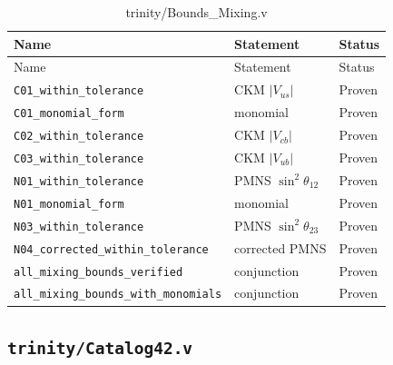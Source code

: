 \begin{longtable}{lll}
\toprule
Name & Statement & Status \\
\midrule
\endfirsthead
\toprule
Name & Statement & Status \\
\midrule
\endhead
\bottomrule
\endfoot
\bottomrule
\caption{trinity/Bounds\_Mixing.v}
\endlastfoot
\texttt{C01\_within\_tolerance} & CKM $|V_{us}|$ & Proven \\
\texttt{C01\_monomial\_form} & monomial & Proven \\
\texttt{C02\_within\_tolerance} & CKM $|V_{cb}|$ & Proven \\
\texttt{C03\_within\_tolerance} & CKM $|V_{ub}|$ & Proven \\
\texttt{N01\_within\_tolerance} & PMNS $\sin^{2}\theta_{12}$ & Proven \\
\texttt{N01\_monomial\_form} & monomial & Proven \\
\texttt{N03\_within\_tolerance} & PMNS $\sin^{2}\theta_{23}$ & Proven \\
\texttt{N04\_corrected\_within\_tolerance} & corrected PMNS & Proven \\
\texttt{all\_mixing\_bounds\_verified} & conjunction & Proven \\
\texttt{all\_mixing\_bounds\_with\_monomials} & conjunction & Proven \\
\end{longtable}

\subsection{\texttt{trinity/Catalog42.v}}
\label{sec:A-coq-cat42}

